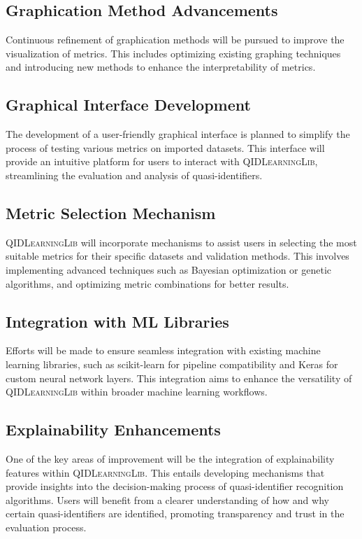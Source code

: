 \documentclass[twoside,11pt]{article}
\begin{document}
\subsection{Graphication Method Advancements}
Continuous refinement of graphication methods will be pursued to improve the visualization of metrics. This includes optimizing existing graphing techniques and introducing new methods to enhance the interpretability of metrics.

\subsection{Graphical Interface Development}
The development of a user-friendly graphical interface is planned to simplify the process of testing various metrics on imported datasets. This interface will provide an intuitive platform for users to interact with \textsc{QIDLearningLib}, streamlining the evaluation and analysis of quasi-identifiers.

\subsection{Metric Selection Mechanism}
\textsc{QIDLearningLib} will incorporate mechanisms to assist users in selecting the most suitable metrics for their specific datasets and validation methods. This involves implementing advanced techniques such as Bayesian optimization or genetic algorithms, and optimizing metric combinations for better results.

\subsection{Integration with ML Libraries}
Efforts will be made to ensure seamless integration with existing machine learning libraries, such as scikit-learn for pipeline compatibility and Keras for custom neural network layers. This integration aims to enhance the versatility of \textsc{QIDLearningLib} within broader machine learning workflows.

\subsection{Explainability Enhancements}
One of the key areas of improvement will be the integration of explainability features within \textsc{QIDLearningLib}. This entails developing mechanisms that provide insights into the decision-making process of quasi-identifier recognition algorithms. Users will benefit from a clearer understanding of how and why certain quasi-identifiers are identified, promoting transparency and trust in the evaluation process.
\end{document}
